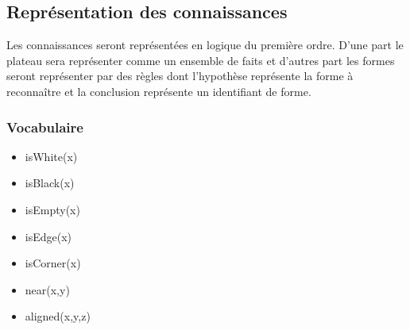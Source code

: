 \subsection{Représentation des connaissances}
	Les connaissances seront représentées en logique du première ordre. D'une part le plateau sera représenter comme un ensemble de faits et d'autres part les \og formes \fg{} seront représenter par des règles dont l'hypothèse représente la forme à reconnaître et la conclusion représente un identifiant de forme.
	
	\subsubsection{Vocabulaire} 
	\begin{itemize}
	\item isWhite(x)
  \item isBlack(x)
  \item isEmpty(x)
  \item isEdge(x)
  \item isCorner(x)
  \item near(x,y)
  \item aligned(x,y,z)
	\end{itemize}

\label{specs_voc_fol}